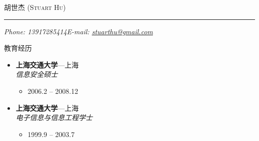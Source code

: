 \documentclass[11pt,oneside]{article}
\makeatletter
\newcommand{\name}{胡世杰 (Stuart Hu)}
\newcommand{\phone}{Phone: 13917285414}
\newcommand{\email}{E-mail: \href{mailto:stuarthu@gmail.com}{stuarthu@gmail.com}}
\newcommand{\bigname}[1]{
	\begin{center}\selectfont\Huge\scshape#1\end{center}
}
\newenvironment{ressection}[1]{
	\vspace{4pt}
	{\selectfont\Large#1}
	\begin{itemize}
	\vspace{3pt}
}{
	\end{itemize}
}
\newcommand{\ressubitem}[1]{
	\vspace{-1pt}
	\item \begin{flushleft} #1 \end{flushleft}
}
\newcommand{\resbigitem}[3]{
	\vspace{-5pt}
	\item
	\textbf{#1}---#2 \\
	\textit{#3}
}
\newenvironment{ressubsec}[3]{
	\resbigitem{#1}{#2}{#3}
	\vspace{-2pt}
	\begin{itemize}
}{
    \end{itemize}
}
\makeatother
\begin{document}
\bigname{\name}

\vspace{-8pt} \rule{\textwidth}{1pt}

\vspace{-1pt} {\small\itshape \phone \hfill \email}

\vspace{8 pt}


\begin{ressection}{教育经历}

	\begin{ressubsec}{上海交通大学}{上海}{信息安全硕士}
		\ressubitem{2006.2 -- 2008.12}
	\end{ressubsec}

	\begin{ressubsec}{上海交通大学}{上海}{电子信息与信息工程学士}
		\ressubitem{1999.9 -- 2003.7}
	\end{ressubsec}

\end{ressection}
\end{document}
